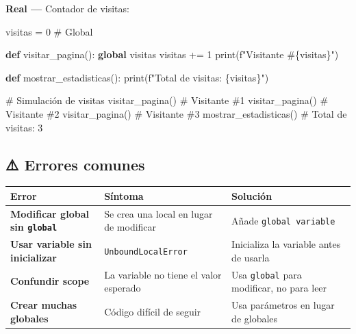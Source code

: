 \documentclass[
  doc,
  floatsintext,
  longtable,
  a4paper,
  nolmodern,
  notxfonts,
  notimes,
  12pt,
  colorlinks=true,linkcolor=blue,citecolor=blue,urlcolor=blue]{apa7}
\newenvironment{Shaded}{\begin{snugshade}}{\end{snugshade}}
\newcommand{\BuiltInTok}[1]{\textcolor[rgb]{0.00,0.23,0.31}{#1}}
\newcommand{\CommentTok}[1]{\textcolor[rgb]{0.37,0.37,0.37}{#1}}
\newcommand{\DecValTok}[1]{\textcolor[rgb]{0.68,0.00,0.00}{#1}}
\newcommand{\KeywordTok}[1]{\textcolor[rgb]{0.00,0.23,0.31}{\textbf{#1}}}
\newcommand{\NormalTok}[1]{\textcolor[rgb]{0.00,0.23,0.31}{#1}}
\newcommand{\OperatorTok}[1]{\textcolor[rgb]{0.37,0.37,0.37}{#1}}
\newcommand{\SpecialCharTok}[1]{\textcolor[rgb]{0.37,0.37,0.37}{#1}}
\newcommand{\SpecialStringTok}[1]{\textcolor[rgb]{0.13,0.47,0.30}{#1}}
\newcounter{none} %
\begin{document}
\textbf{Real ---} Contador de visitas:

\begin{Shaded}
\begin{Highlighting}[]
\NormalTok{visitas }\OperatorTok{=} \DecValTok{0}  \CommentTok{\# Global}

\KeywordTok{def}\NormalTok{ visitar\_pagina():}
    \KeywordTok{global}\NormalTok{ visitas}
\NormalTok{    visitas }\OperatorTok{+=} \DecValTok{1}
    \BuiltInTok{print}\NormalTok{(}\SpecialStringTok{f"Visitante \#}\SpecialCharTok{\{}\NormalTok{visitas}\SpecialCharTok{\}}\SpecialStringTok{"}\NormalTok{)}

\KeywordTok{def}\NormalTok{ mostrar\_estadisticas():}
    \BuiltInTok{print}\NormalTok{(}\SpecialStringTok{f"Total de visitas: }\SpecialCharTok{\{}\NormalTok{visitas}\SpecialCharTok{\}}\SpecialStringTok{"}\NormalTok{)}

\CommentTok{\# Simulación de visitas}
\NormalTok{visitar\_pagina()  }\CommentTok{\# Visitante \#1}
\NormalTok{visitar\_pagina()  }\CommentTok{\# Visitante \#2}
\NormalTok{visitar\_pagina()  }\CommentTok{\# Visitante \#3}
\NormalTok{mostrar\_estadisticas()  }\CommentTok{\# Total de visitas: 3}
\end{Highlighting}
\end{Shaded}

\subsection{⚠️ Errores comunes}\label{errores-comunes}

{\def\LTcaptype{none} %
\begin{longtable}[]{@{}
  >{\raggedright\arraybackslash}p{}
  >{\raggedright\arraybackslash}p{}
  >{\raggedright\arraybackslash}p{}@{}}
\toprule\noalign{}
\begin{minipage}[b]{\linewidth}\raggedright
Error
\end{minipage} & \begin{minipage}[b]{\linewidth}\raggedright
Síntoma
\end{minipage} & \begin{minipage}[b]{\linewidth}\raggedright
Solución
\end{minipage} \\
\midrule\noalign{}
\endhead
\bottomrule\noalign{}
\endlastfoot
\textbf{Modificar global sin \texttt{global}} & Se crea una local en
lugar de modificar & Añade \texttt{global\ variable} \\
\textbf{Usar variable sin inicializar} & \texttt{UnboundLocalError} &
Inicializa la variable antes de usarla \\
\textbf{Confundir scope} & La variable no tiene el valor esperado & Usa
\texttt{global} para modificar, no para leer \\
\textbf{Crear muchas globales} & Código difícil de seguir & Usa
parámetros en lugar de globales \\
\end{longtable}
}
\end{document}
